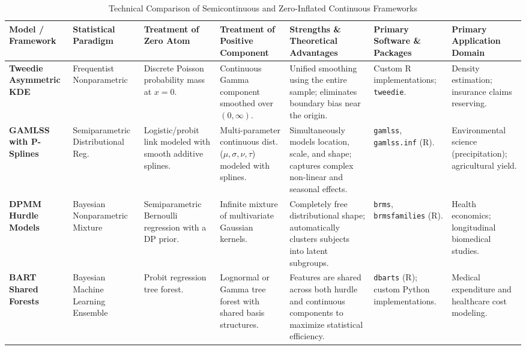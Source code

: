 \begin{landscape}
\begin{table}[p]
\centering
\caption{Technical Comparison of Semicontinuous and Zero-Inflated Continuous Frameworks}
\label{tab:tech_comparison}
\vskip 0.1in
\scriptsize
\begin{tabularx}{\linewidth}{p{2.2cm} p{2cm} p{2.2cm} p{2.2cm} X p{1.8cm} p{2.2cm}}
\toprule
\textbf{Model / Framework} & \textbf{Statistical Paradigm} & \textbf{Treatment of Zero Atom} & \textbf{Treatment of Positive Component} & \textbf{Strengths \& Theoretical Advantages} & \textbf{Primary Software \& Packages} & \textbf{Primary Application Domain} \\
\midrule
\textbf{Tweedie Asymmetric KDE} \cite{tweedie_kde, tweedie1984} & Frequentist Nonparametric & Discrete Poisson probability mass at $x=0$. \cite{tweedie_kde} & Continuous Gamma component smoothed over $(0, \infty)$. \cite{tweedie_kde} & Unified smoothing using the entire sample; eliminates boundary bias near the origin. \cite{tweedie_kde, boundary_correction} & Custom R implementations; \texttt{tweedie}. \cite{manning2001} & Density estimation; insurance claims reserving. \cite{tweedie_kde, tweedie1984} \\
\addlinespace
\textbf{GAMLSS with P-Splines} \cite{stasinopoulos2017} & Semiparametric Distributional Reg. & Logistic/probit link modeled with smooth additive splines. \cite{stasinopoulos2017} & Multi-parameter continuous dist. ($\mu, \sigma, \nu, \tau$) modeled with splines. \cite{stasinopoulos2017} & Simultaneously models location, scale, and shape; captures complex non-linear and seasonal effects. \cite{stasinopoulos2017} & \texttt{gamlss}, \texttt{gamlss.inf} (R). \cite{manning2001, duan1983} & Environmental science (precipitation); agricultural yield. \cite{stasinopoulos2017, neelon2014} \\
\addlinespace
\textbf{DPMM Hurdle Models} \cite{neelon2010, neelon2019} & Bayesian Nonparametric Mixture & Semiparametric Bernoulli regression with a DP prior. \cite{neelon2010} & Infinite mixture of multivariate Gaussian kernels. \cite{neelon2010} & Completely free distributional shape; automatically clusters subjects into latent subgroups. \cite{neelon2010, subgroup_bnp} & \texttt{brms}, \texttt{brmsfamilies} (R). \cite{brms2017, brms2018} & Health economics; longitudinal biomedical studies. \cite{subgroup_bnp, neelon2019} \\
\addlinespace
\textbf{BART Shared Forests} \cite{bart2010, shared_forests} & Bayesian Machine Learning Ensemble & Probit regression tree forest. \cite{shared_forests} & Lognormal or Gamma tree forest with shared basis structures. \cite{shared_forests} & Features are shared across both hurdle and continuous components to maximize statistical efficiency. \cite{shared_forests} & \texttt{dbarts} (R); custom Python implementations. \cite{bart2010, shared_forests} & Medical expenditure and healthcare cost modeling. \cite{bart2010, shared_forests} \\

\end{tabularx}
\end{table}
\end{landscape}
